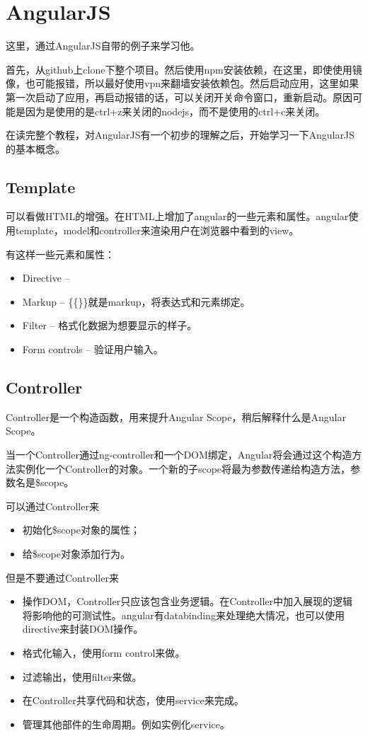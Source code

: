	\section{AngularJS}
	  这里，通过AngularJS自带的例子来学习他。
	
	  首先，从github上clone下整个项目。然后使用npm安装依赖，在这里，即使使用镜像，也可能报错，所以最好使用vpn来翻墙安装依赖包。然后启动应用，这里如果第一次启动了应用，再启动报错的话，可以关闭开关命令窗口，重新启动。原因可能是因为是使用的是ctrl+z来关闭的nodejs，而不是使用的ctrl+c来关闭。
	
	  在读完整个教程，对AngularJS有一个初步的理解之后，开始学习一下AngularJS的基本概念。
	
	
	  \subsection{Template}
	  可以看做HTML的增强。在HTML上增加了angular的一些元素和属性。angular使用template，model和controller来渲染用户在浏览器中看到的view。
	
	  有这样一些元素和属性：
	  \begin{itemize}
	  \item Directive --
	  \item Markup -- \{\{\}\}就是markup，将表达式和元素绑定。 
	  \item Filter -- 格式化数据为想要显示的样子。
	  \item Form controls -- 验证用户输入。
	  \end{itemize}
	
	
	  \subsection{Controller}
	
	  Controller是一个构造函数，用来提升Angular Scope，稍后解释什么是Angular Scope。
	
	  当一个Controller通过ng-controller和一个DOM绑定，Angular将会通过这个构造方法实例化一个Controller的对象。一个新的子scope将最为参数传递给构造方法，参数名是\$scope。
	
	  可以通过Controller来
	  \begin{itemize}
	  \item 初始化\$scope对象的属性；
	  \item 给\$scope对象添加行为。
	  \end{itemize}
	
	  但是不要通过Controller来
	  \begin{itemize}
	  \item 操作DOM，Controller只应该包含业务逻辑。在Controller中加入展现的逻辑将影响他的可测试性。angular有databinding来处理绝大情况，也可以使用directive来封装DOM操作。
	  \item 格式化输入，使用form control来做。
	  \item 过滤输出，使用filter来做。
	  \item 在Controller共享代码和状态，使用service来完成。
	  \item 管理其他部件的生命周期。例如实例化service。
	  \end{itemize}
	
